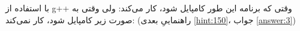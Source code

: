 \section{}
\paragraph{}\label{hint:244}
با استفاده از g++ وقتی که برنامه این طور کامپایل شود، کار می‌کند:
\LTR\noindent
{}
\RTL
ولی وقتی به صورت زیر کامپایل شود، کار نمی‌کند:
\LTR\noindent
{}
\RTL
(راهنماییِ بعدی \ref{hint:150}، جواب \ref{answer:3})